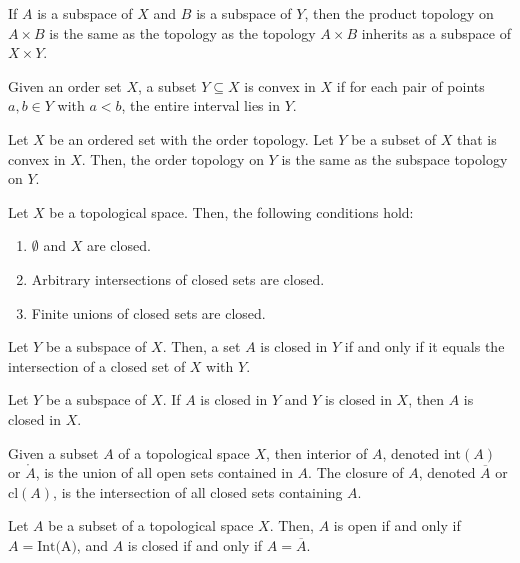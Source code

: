\documentclass{article}
\begin{document}
\medskip{}

    If $A$ is a subspace of $X$ and $B$ is a subspace of $Y$, then the product topology on $A \times B$ is the same as the topology as the topology $A \times B$ inherits as a subspace of $X \times Y$.

\medskip{}

    Given an order set $X$, a subset $Y \subseteq X$ is convex in $X$ if for each pair of points $a,b \in Y$ with $a<b$, the entire interval lies in $Y$.

\medskip{}

    Let $X$ be an ordered set with the order topology.
    Let $Y$ be a subset of $X$ that is convex in $X$.
    Then, the order topology on $Y$ is the same as the subspace topology on $Y$.

\medskip{}

    Let $X$ be a topological space. Then, the following conditions hold:
    \begin{enumerate}
        \item $\emptyset$ and $X$ are closed.
        \item Arbitrary intersections of closed sets are closed.
        \item Finite unions of closed sets are closed.
    \end{enumerate}

\medskip{}

    Let $Y$ be a subspace of $X$. Then, a set $A$ is closed in $Y$ if and only if it equals the intersection of a closed set of $X$ with $Y$.

\medskip{}

    Let $Y$ be a subspace of $X$. If $A$ is closed in $Y$ and $Y$ is closed in $X$, then $A$ is closed in $X$.

\medskip{}

    Given a subset $A$ of a topological space $X$, then interior of $A$, denoted $\text{int}(A)$ or $\mathring A$, is the union of all open sets contained in $A$.
    The closure of $A$, denoted $\overline A$ or $\text{cl}(A)$, is the intersection of all closed sets containing $A$.

\medskip{}

    Let $A$ be a subset of a topological space $X$. Then, $A$ is open if and only if $A = \text{Int(A)}$, and $A$ is closed if and only if $A=\overline A$.
\end{document}

